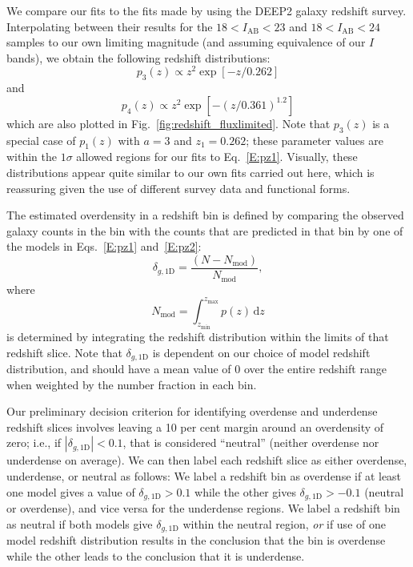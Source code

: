 \documentclass[twocolumn,useAMS,usenatbib]{mn2e}
\begin{document}
We compare our fits to the fits made by \cite{2004ApJ...617..765C} using 
the DEEP2 galaxy redshift survey. Interpolating between their results for the $18<I_\text{AB}<23$
and $18<I_\text{AB}<24$ samples to our own limiting magnitude (and assuming equivalence of our $I$ bands), we obtain the following redshift distributions:
\begin{equation}
 \label{E;pz3}
 p_3(z) \propto z^2 \exp{[-z/0.262]}
\end{equation}
and 
\begin{equation}
 \label{E;pz4}
 p_4(z) \propto z^2 \exp{[-(z/0.361)^{1.2}]}
\end{equation}
which are also plotted in Fig.~\ref{fig:redshift_fluxlimited}.  
Note that $p_3(z)$ is a special case of $p_1(z)$ with $a=3$ and
$z_1=0.262$; these parameter values are within the $1\sigma$ allowed
regions for our fits to Eq.~\ref{E:pz1}.  Visually, these
distributions appear quite similar to our own fits carried out here, which is
reassuring given the use of different survey data and functional forms.


The estimated overdensity in a redshift bin is defined by comparing
the observed galaxy counts in the bin with the counts that are
predicted in that bin by one of the models in Eqs.~\eqref{E:pz1}
and~\eqref{E:pz2}:
\begin{equation}
\delta_{g,\text{1D}}=\frac{(N-N_{\text{mod}})}{N_{\text{mod}}},
\end{equation}
where
\begin{equation}
N_\text{mod} = \int_{z_\text{min}}^{z_\text{max}} p(z) \,\mathrm{d}z
\end{equation}
is determined by integrating the redshift distribution within the
limits of that redshift slice. 
Note that $\delta_{g,\text{1D}}$ is dependent on our choice of model
redshift distribution, and should have a mean value of $0$ over the
entire redshift range when weighted by the number fraction in each bin.

Our preliminary decision criterion for identifying overdense and underdense
redshift slices involves leaving a 10 per cent margin around an
overdensity of zero; i.e., if $\left| \delta_{g,\text{1D}} \right| <
0.1$, that is considered ``neutral'' (neither overdense nor
underdense on average).  We can then label each redshift slice as
either overdense, underdense, or neutral as follows: 
We label a redshift bin as overdense if at least one model gives a
value of $\delta_{g,\text{1D}} > 0.1$ while the other gives
$\delta_{g,\text{1D}} > -0.1$ 
(neutral or overdense), and vice versa for the underdense regions. We
label a redshift bin as neutral if both models give
$\delta_{g,\text{1D}}$ within the neutral region,  
\emph{or} if use of one model redshift distribution results in the
conclusion that the bin is overdense while the other leads to the
conclusion that it is underdense. 
\end{document}
